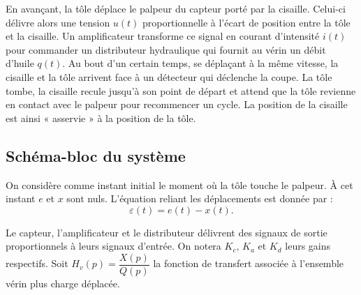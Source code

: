 En avançant, la tôle déplace le palpeur du capteur porté par la cisaille. Celui-ci délivre alors une tension $u(t)$ proportionnelle à l'écart de position entre la tôle et la cisaille. Un amplificateur transforme ce signal en courant d'intensité $i(t)$ pour commander un distributeur hydraulique qui fournit au vérin un débit d'huile $q(t)$. Au bout d'un certain temps, se déplaçant à la même vitesse, la cisaille et la tôle arrivent face à un détecteur qui déclenche la coupe. La tôle tombe, la cisaille recule jusqu'à son point de départ et attend que la tôle revienne en contact avec le palpeur pour recommencer un cycle. La position de la cisaille est ainsi « asservie » à la position de la tôle.





\fi
\subsection*{Schéma-bloc du système}
\ifprof
\else
{}
On considère comme instant initial le moment où la tôle touche le palpeur. À cet instant $e$ et $x$ sont nuls. L'équation reliant les déplacements est donnée par :
$$\varepsilon(t)=e(t)-x(t).$$


Le capteur, l'amplificateur et le distributeur délivrent des signaux de sortie proportionnels à leurs signaux d'entrée. On notera $K_c$, $K_a$ et $K_d$ leurs gains respectifs. 
Soit  $H_v(p)=\dfrac{X(p)}{Q(p)}$ la fonction de transfert associée à l'ensemble vérin plus charge déplacée.

